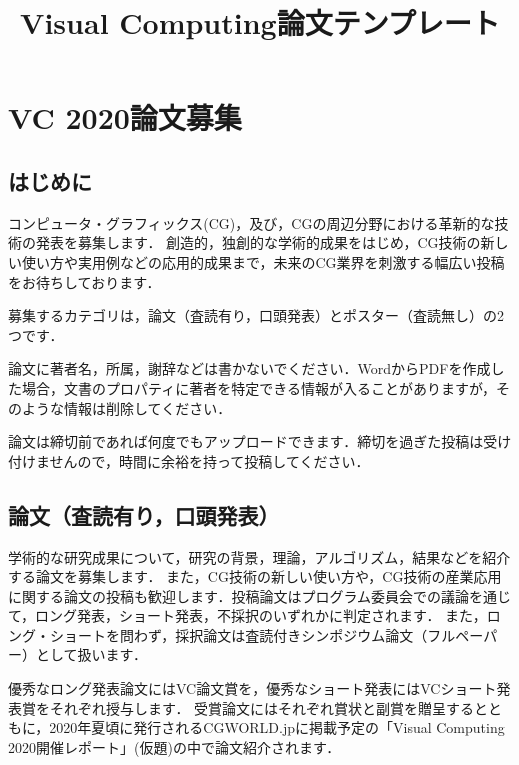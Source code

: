 \documentclass{vc}
\title{Visual Computing論文テンプレート}
\begin{document}
\maketitle


\section{VC 2020論文募集}

\subsection{はじめに}

コンピュータ・グラフィックス(CG)，及び，CGの周辺分野における革新的な技術の発表を募集します．
創造的，独創的な学術的成果をはじめ，CG技術の新しい使い方や実用例などの応用的成果まで，未来のCG業界を刺激する幅広い投稿をお待ちしております．

募集するカテゴリは，論文（査読有り，口頭発表）とポスター（査読無し）の2つです．

論文に著者名，所属，謝辞などは書かないでください．WordからPDFを作成した場合，文書のプロパティに著者を特定できる情報が入ることがありますが，そのような情報は削除してください．

論文は締切前であれば何度でもアップロードできます．締切を過ぎた投稿は受け付けませんので，時間に余裕を持って投稿してください．

\subsection{論文（査読有り，口頭発表）}

学術的な研究成果について，研究の背景，理論，アルゴリズム，結果などを紹介する論文を募集します． また，CG技術の新しい使い方や，CG技術の産業応用に関する論文の投稿も歓迎します．投稿論文はプログラム委員会での議論を通じて，ロング発表，ショート発表，不採択のいずれかに判定されます．
また，ロング・ショートを問わず，採択論文は査読付きシンポジウム論文（フルペーパー）として扱います．

優秀なロング発表論文にはVC論文賞を，優秀なショート発表にはVCショート発表賞をそれぞれ授与します． 受賞論文にはそれぞれ賞状と副賞を贈呈するとともに，2020年夏頃に発行されるCGWORLD.jpに掲載予定の「Visual Computing 2020開催レポート」(仮題)の中で論文紹介されます．
\end{document}
